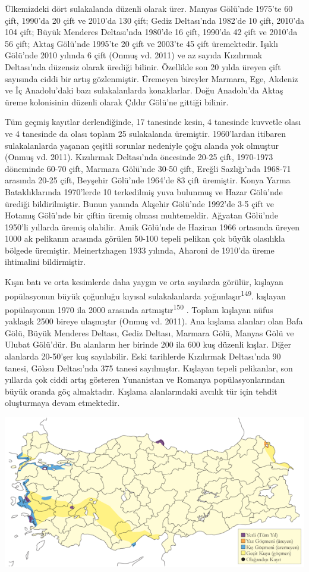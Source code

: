 \documentclass[
  letterpaper,
  DIV=11,
  numbers=noendperiod]{scrreprt}
\begin{document}
Ülkemizdeki dört sulakalanda düzenli olarak ürer. Manyas Gölü'nde
1975'te 60 çift, 1990'da 20 çift ve 2010'da 130 çift; Gediz Deltası'nda
1982'de 10 çift, 2010'da 104 çift; Büyük Menderes Deltası'nda 1980'de 16
çift, 1990'da 42 çift ve 2010'da 56 çift; Aktaş Gölü'nde 1995'te 20 çift
ve 2003'te 45 çift üremektedir. Işıklı Gölü'nde 2010 yılında 6 çift
(Onmuş vd. 2011) ve az sayıda Kızılırmak Deltası'nda düzensiz olarak
ürediği bilinir. Özellikle son 20 yılda üreyen çift sayısında ciddi bir
artış gözlenmiştir. Üremeyen bireyler Marmara, Ege, Akdeniz ve İç
Anadolu'daki bazı sulakalanlarda konaklarlar. Doğu Anadolu'da Aktaş
üreme kolonisinin düzenli olarak Çıldır Gölü'ne gittiği bilinir.

Tüm geçmiş kayıtlar derlendiğinde, 17 tanesinde kesin, 4 tanesinde
kuvvetle olası ve 4 tanesinde da olası toplam 25 sulakalanda üremiştir.
1960'lardan itibaren sulakalanlarda yaşanan çeşitli sorunlar nedeniyle
çoğu alanda yok olmuştur (Onmuş vd. 2011). Kızılırmak Deltası'nda
öncesinde 20-25 çift, 1970-1973 döneminde 60-70 çift, Marmara Gölü'nde
30-50 çift, Ereğli Sazlığı'nda 1968-71 arasında 20-25 çift, Beyşehir
Gölü'nde 1964'de 83 çift üremiştir. Konya Yarma Bataklıklarında
1970'lerde 10 terkedilmiş yuva bulunmuş ve Hazar Gölü'nde ürediği
bildirilmiştir. Bunun yanında Akşehir Gölü'nde 1992'de 3-5 çift ve
Hotamış Gölü'nde bir çiftin üremiş olması muhtemeldir. Ağyatan Gölü'nde
1950'li yıllarda üremiş olabilir. Amik Gölü'nde de Haziran 1966
ortasında üreyen 1000 ak pelikanın arasında görülen 50-100 tepeli
pelikan çok büyük olasılıkla bölgede üremiştir. Meinertzhagen 1933
yılında, Aharoni de 1910'da üreme ihtimalini bildirmiştir.

Kışın batı ve orta kesimlerde daha yaygın ve orta sayılarda görülür,
kışlayan popülasyonun büyük çoğunluğu kıyısal sulakalanlarda
yoğunlaşır\textsuperscript{149}. kışlayan popülasyonun 1970 ila 2000
arasında artmıştır\textsuperscript{150} . Toplam kışlayan nüfus yaklaşık
2500 bireye ulaşmıştır (Onmuş vd. 2011). Ana kışlama alanları olan Bafa
Gölü, Büyük Menderes Deltası, Gediz Deltası, Marmara Gölü, Manyas Gölü
ve Ulubat Gölü'dür. Bu alanların her birinde 200 ila 600 kuş düzenli
kışlar. Diğer alanlarda 20-50'şer kuş sayılabilir. Eski tarihlerde
Kızılırmak Deltası'nda 90 tanesi, Göksu Deltası'nda 375 tanesi
sayılmıştır. Kışlayan tepeli pelikanlar, son yıllarda çok ciddi artış
gösteren Yunanistan ve Romanya popülasyonlarından büyük oranda göç
almaktadır. Kışlama alanlarındaki avcılık tür için tehdit oluşturmaya
devam etmektedir.

\includegraphics{images/harita_Page_075.png}
\end{document}
